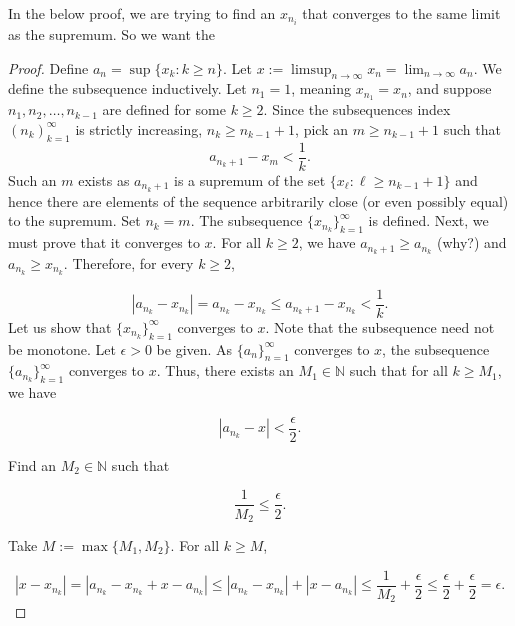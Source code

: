 \documentclass[../main.tex]{subfiles}
\begin{document}
    
    
    
    \begin{remark}
        In the below proof, we are trying to find an \(x_{n_i}\) that converges to the same limit as the supremum. So we want the  
    \end{remark}
    
    
    
    
    
    \begin{proof}
    Define $a_n = \sup\{x_k : k \geq n\}$. Let $x := \limsup_{n \to \infty} x_n = \lim_{n \to \infty} a_n$. We define the subsequence inductively. Let $n_1 = 1$, meaning \(x_{n_1} = x_n\), and suppose $n_1, n_2, \dots, n_{k-1}$ are defined for some $k \geq 2$. Since the subsequences index \( (n_k)_{k=1}^{\infty}\) is strictly increasing, \(n_k \geq n_{k-1}+1\), pick an $m \geq n_{k-1} + 1$ such that
    \[
    a_{n_k+1} - x_m < \frac{1}{k}.
    \]
    Such an $m$ exists as $a_{n_k+1}$ is a supremum of the set $\{x_\ell : \ell \geq n_{k-1} + 1\}$ and hence there are elements of the sequence arbitrarily close (or even possibly equal) to the supremum. Set
    $n_k = m$. The subsequence $\{x_{n_k}\}_{k=1}^{\infty}$ is defined. Next, we must prove that it converges to $x$.
    For all $k \geq 2$, we have $a_{n_k+1} \geq a_{n_k}$ (why?) and $a_{n_k} \geq x_{n_k}$. Therefore, for every $k \geq 2$,
    
    \[
    |a_{n_k} - x_{n_k}| = a_{n_k} - x_{n_k} \leq a_{n_k+1} - x_{n_k} < \frac{1}{k}.
    \]
    Let us show that $\{x_{n_k}\}_{k=1}^{\infty}$ converges to $x$. Note that the subsequence need not be
    monotone. Let $\epsilon > 0$ be given. As $\{a_n\}_{n=1}^{\infty}$ converges to $x$, the subsequence $\{a_{n_k}\}_{k=1}^{\infty}$
    converges to $x$. Thus, there exists an $M_1 \in \mathbb{N}$ such that for all $k \geq M_1$, we have
    
    \[
    |a_{n_k} - x| < \frac{\epsilon}{2}.
    \]
    
    Find an $M_2 \in \mathbb{N}$ such that
    
    \[
    \frac{1}{M_2} \leq \frac{\epsilon}{2}.
    \]
    
    Take $M := \max\{M_1, M_2\}$. For all $k \geq M$,
    
    \[
    |x - x_{n_k}| = |a_{n_k} - x_{n_k} + x - a_{n_k}| \leq |a_{n_k} - x_{n_k}| + |x - a_{n_k}|\leq \frac{1}{M_2} + \frac{\epsilon}{2} \leq \frac{\epsilon}{2} + \frac{\epsilon}{2} = \epsilon.
    \]
     
    \end{proof}
    
\end{document}
